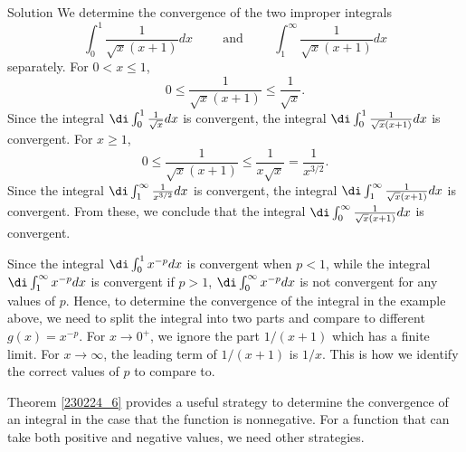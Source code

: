 \begin{example}[label=20230527]{}
\begin{solution}{Solution}
We determine  the convergence of the two improper integrals
\[\int_0^1\frac{1}{\sqrt{x}(x+1)}dx\hspace{1cm}\text{and}\hspace{1cm}\int_1^{\infty}\frac{1}{\sqrt{x}(x+1)}dx\] separately.
For $0<x\leq 1$,
\[0\leq \frac{1}{\sqrt{x}(x+1)} \leq \frac{1}{\sqrt{x}}.\] Since the integral $\di\int_0^1\frac{1}{\sqrt{x}}dx$ is convergent, the integral $\di  \int_0^1\frac{1}{\sqrt{x}(x+1)} dx$ is convergent. 
For $x\geq 1$,
\[0\leq \frac{1}{\sqrt{x}(x+1)} \leq \frac{1}{x\sqrt{x}}=\frac{1}{x^{3/2}}.\]   Since the integral $\di\int_1^{\infty}\frac{1}{x^{3/2}}dx$ is convergent, the integral $\di\int_1^{\infty}  \frac{1}{\sqrt{x}(x+1)} dx$ is convergent. From these, we conclude that the integral  $\di \int_0^{\infty}\frac{1}{\sqrt{x}(x+1)}dx$ is convergent.
\end{solution}

Since the integral $\di\int_0^1x^{-p}dx$ is convergent when $p<1$, while the integral $\di\int_1^{\infty}x^{-p}dx$ is convergent if $p>1$, $\di\int_0^{\infty}x^{-p}dx$ is not convergent for any values of $p$. Hence, to determine the convergence of the integral in the example above, we need to split the integral into two parts and compare to different $g(x)=x^{-p}$. For $x\to 0^+$, we ignore the part $1/(x+1)$ which has a finite limit. For $x\to \infty$, the leading term of $1/(x+1)$ is $1/x$. This is how we identify the correct values of $p$ to compare to.



 Theorem \ref{230224_6}  provides a useful strategy to determine the convergence of an integral in the case that the function is nonnegative. For a function that can take  both positive and negative values, we need other strategies.
 

\end{example}
